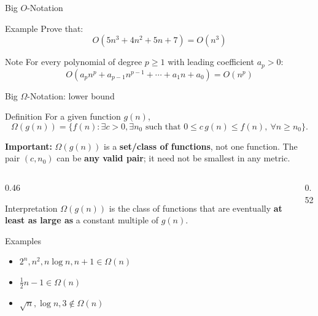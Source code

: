 \documentclass[aspectratio=169]{beamer}
\begin{document}
\begin{frame}{Big $O$-Notation}
  \begin{block}{Example}
  Prove that:
  \[
  O(5n^3+4n^2+5n+7) = O(n^3)
  \]
\end{block}\pause

 \begin{alertblock}{Note}
        For every polynomial of degree $p\ge 1$ with leading coefficient $a_p>0$:
        \[
  O(a_p n^p + a_{p-1} n^{p-1} + \cdots + a_1n +a_0) = O(n^p)
  \]
      \end{alertblock}
\end{frame}







\begin{frame}{Big $\Omega$-Notation: lower bound}
  \small
  \begin{block}{Definition}
    For a given function $g(n)$,
    \[
      \Omega(g(n))=\{f(n): \exists c>0,\exists n_0\text{ such that }
      0\le c\,g(n)\le f(n),\ \forall n\ge n_0\}.
    \]
  \end{block}
  {\small\color{red!75!black}\textbf{Important:} $\Omega(g(n))$ is a \textbf{set/class of functions}, not one function. The pair $(c,n_0)$ can be \textbf{any valid pair}; it need not be smallest in any metric.}\vspace{-0.35em}
  \begin{columns}[T]
    \begin{column}{0.46\textwidth}
      \begin{exampleblock}{Interpretation}
        $\Omega(g(n))$ is the class of functions that are eventually
        \textbf{at least as large as} a constant multiple of $g(n)$.
      \end{exampleblock}
      \begin{alertblock}{Examples}
        \scriptsize
        \begin{itemize}\setlength{\itemsep}{0.1em}
          \item $2^n,n^2,n\log n,n+1\in \Omega(n)$
          \item $\frac12 n-1\in \Omega(n)$
          \item $\sqrt n,\log n,3\notin \Omega(n)$
        \end{itemize}
      \end{alertblock}
    \end{column}
    \begin{column}{0.52\textwidth}
      \begin{center}

\end{center}
\end{column}
\end{columns}
\end{frame}
\end{document}
